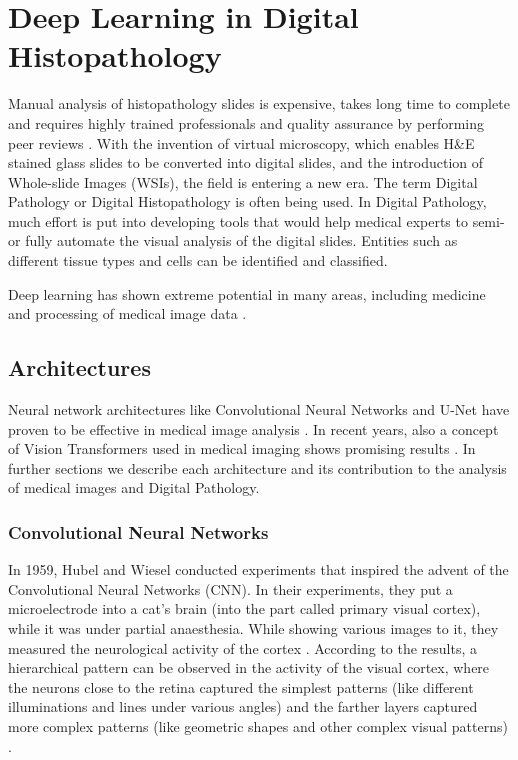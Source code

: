 \chapter{Deep Learning in Digital Histopathology}
Manual analysis of histopathology slides is expensive, takes long time to complete and requires highly trained professionals and quality assurance by performing peer reviews \cite{Wemmert2021}. With the invention of virtual microscopy, which enables H\&E stained glass slides to be converted into digital slides, and the introduction of Whole-slide Images (WSIs), the field is entering a new era. The term Digital Pathology or Digital Histopathology is often being used. In Digital Pathology, much effort is put into developing tools that would help medical experts to semi- or fully automate the visual analysis of the digital slides. Entities such as different tissue types and cells can be identified and classified.

Deep learning has shown extreme potential in many areas, including medicine and processing of medical image data \cite{LeCun2015}.

\section{Architectures}
Neural network architectures like Convolutional Neural Networks \cite{LeCun2015-2} and U-Net \cite{Ronneberger2015} have proven to be effective in medical image analysis \cite{Santosh2022-2}. In recent years, also a concept of Vision Transformers \cite{Dosovitskiy2020, Hu2023} used in medical imaging shows promising results \cite{Shamshad2023, Hu2023, He2023}. In further sections we describe each architecture and its contribution to the analysis of medical images and Digital Pathology.

\subsection{Convolutional Neural Networks}
In 1959, Hubel and Wiesel conducted experiments that inspired the advent of the Convolutional Neural Networks (CNN). In their experiments, they put a microelectrode into a cat's brain (into the part called primary visual cortex), while it was under partial anaesthesia. While showing various images to it, they measured the neurological activity of the cortex \cite{Hubel1959}. According to the results, a hierarchical pattern can be observed in the activity of the visual cortex, where the neurons close to the retina captured the simplest patterns (like different illuminations and lines under various angles) and the farther layers  captured more complex patterns (like geometric shapes and other complex visual patterns) \cite{Hubel1959}. 

